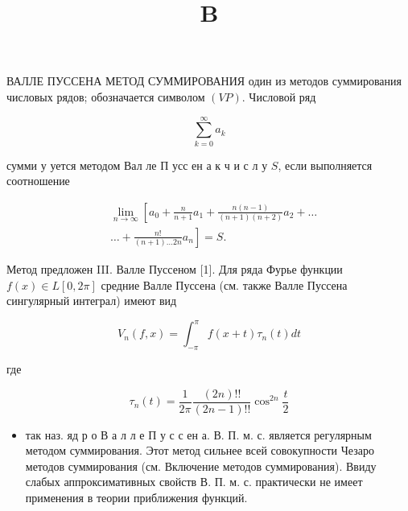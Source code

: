 \documentclass[10pt]{article}
\title{$\mathbf{B}$ }
\author{}
\date{}
\begin{document}
\maketitle

ВАЛЛЕ ПУССЕНА МЕТОД СУММИРОВАНИЯ один из методов суммирования числовых рядов; обозначается символом $(V P)$. Числовой ряд



\[

\sum_{k=0}^{\infty} a_{k}

\]



сумми у уется методом Вал ле П усс ен а к ч и с л у $S$, если выполняется соотношение



\[

\begin{aligned}

& \lim _{n \rightarrow \infty}\left[a_{0}+\frac{n}{n+1} a_{1}+\frac{n(n-1)}{(n+1)(n+2)} a_{2}+\ldots\right. \\

& \left.\ldots+\frac{n !}{(n+1) \ldots 2 n} a_{n}\right]=S \text {. }

\end{aligned}

\]



Метод предложен III. Валле Пуссеном [1]. Для ряда Фурье функции $f(x) \in L[0,2 \pi]$ средние Валле Пуссена (см. также Валле Пуссена сингулярный интеграл) имеют вид



\[

V_{n}(f, x)=\int_{-\pi}^{\pi} f(x+t) \tau_{n}(t) d t

\]



где



\[

\tau_{n}(t)=\frac{1}{2 \pi} \frac{(2 n) ! !}{(2 n-1) ! !} \cos ^{2 n} \frac{t}{2}

\]



\begin{itemize}

  \item так наз. яд р о В а л л е П у с с ен а. В. П. м. с. является регулярным методом суммирования. Этот метод сильнее всей совокупности Чезаро методов суммирования (см. Включение методов суммирования). Ввиду слабых аппроксимативных свойств В. П. м. с. практически не имеет применения в теории приближения функций.

\end{itemize}
\end{document}
